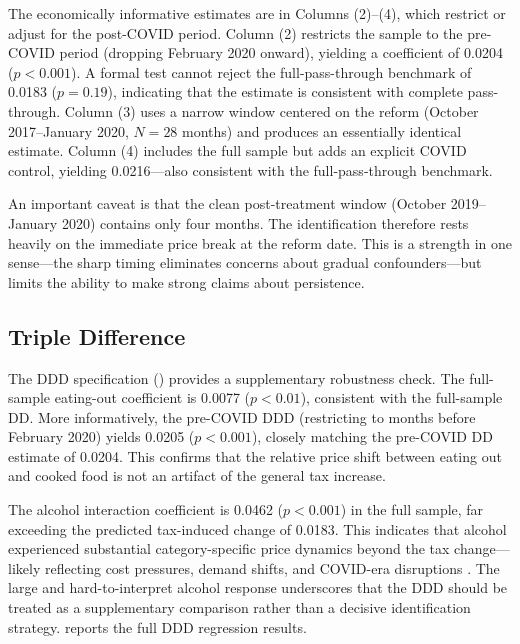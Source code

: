 \documentclass[12pt]{article}
\begin{document}
The economically informative estimates are in Columns (2)--(4), which restrict or adjust for the post-COVID period. Column (2) restricts the sample to the pre-COVID period (dropping February 2020 onward), yielding a coefficient of 0.0204 ($p < 0.001$). A formal test cannot reject the full-pass-through benchmark of 0.0183 ($p = 0.19$), indicating that the estimate is consistent with complete pass-through. Column (3) uses a narrow window centered on the reform (October 2017--January 2020, $N = 28$ months) and produces an essentially identical estimate. Column (4) includes the full sample but adds an explicit COVID control, yielding 0.0216---also consistent with the full-pass-through benchmark.

An important caveat is that the clean post-treatment window (October 2019--January 2020) contains only four months. The identification therefore rests heavily on the immediate price break at the reform date. This is a strength in one sense---the sharp timing eliminates concerns about gradual confounders---but limits the ability to make strong claims about persistence.



\subsection{Triple Difference}

The DDD specification () provides a supplementary robustness check. The full-sample eating-out coefficient is 0.0077 ($p < 0.01$), consistent with the full-sample DD. More informatively, the pre-COVID DDD (restricting to months before February 2020) yields 0.0205 ($p < 0.001$), closely matching the pre-COVID DD estimate of 0.0204. This confirms that the relative price shift between eating out and cooked food is not an artifact of the general tax increase.

The alcohol interaction coefficient is 0.0462 ($p < 0.001$) in the full sample, far exceeding the predicted tax-induced change of 0.0183. This indicates that alcohol experienced substantial category-specific price dynamics beyond the tax change---likely reflecting cost pressures, demand shifts, and COVID-era disruptions \citep{harding2012heterogeneous, kikkawa2019imperfect}. The large and hard-to-interpret alcohol response underscores that the DDD should be treated as a supplementary comparison rather than a decisive identification strategy.  reports the full DDD regression results.
\end{document}

